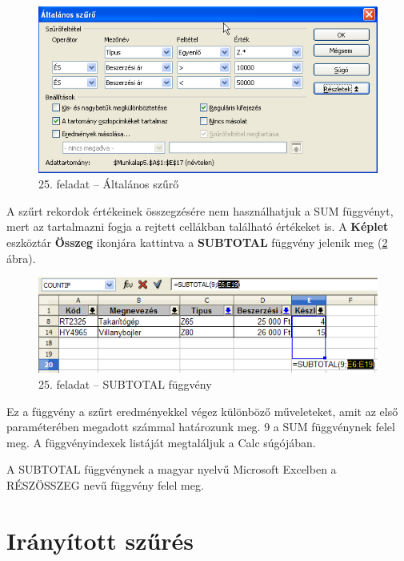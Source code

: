 \begin{figure}[!h]
\begin{center}
\includegraphics[width=13.452cm]{oocalcv1-img116.png}
\caption{25. feladat --  Általános szűrő}\label{25-feladatÁltalános}
\end{center}
\end{figure}

A szűrt rekordok értékeinek összegzésére nem
használhatjuk a SUM függvényt, mert az tartalmazni fogja a
rejtett cellákban található értékeket is. A \textbf{Képlet}
eszköztár \textbf{Összeg} ikonjára kattintva a
\textbf{SUBTOTAL} függvény jelenik meg (\ref{25-feladatSUBTOTAL} ábra).

\begin{figure}[!h]
\begin{center}
\includegraphics[width=13.868cm]{oocalcv1-img117.png}
\caption{25. feladat --  SUBTOTAL függvény}\label{25-feladatSUBTOTAL}
\end{center}
\end{figure}

Ez a függvény a szűrt eredményekkel végez
különböző műveleteket, amit az első paraméterében
megadott számmal határozunk meg. 9 a SUM függvénynek felel meg.
A függvényindexek listáját megtaláljuk a Calc
súgójában.

A SUBTOTAL függvénynek a magyar nyelvű Microsoft Excelben a
RÉSZÖSSZEG nevű függvény felel meg.


\section{Irányított szűrés}

